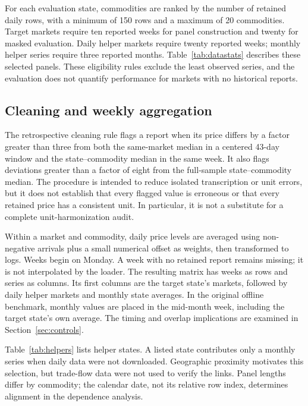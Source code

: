\documentclass[sigconf,nonacm,balance=false]{acmart}
\begin{document}
For each evaluation state, commodities are ranked by the number of retained daily rows, with a minimum of 150 rows and a maximum of 20 commodities. Target markets require ten reported weeks for panel construction and twenty for masked evaluation. Daily helper markets require twenty reported weeks; monthly helper series require three reported months. Table~\ref{tab:datastats} describes these selected panels. These eligibility rules exclude the least observed series, and the evaluation does not quantify performance for markets with no historical reports.



\subsection{Cleaning and weekly aggregation}

The retrospective cleaning rule flags a report when its price differs by a factor greater than three from both the same-market median in a centered 43-day window and the state--commodity median in the same week. It also flags deviations greater than a factor of eight from the full-sample state--commodity median. The procedure is intended to reduce isolated transcription or unit errors, but it does not establish that every flagged value is erroneous or that every retained price has a consistent unit. In particular, it is not a substitute for a complete unit-harmonization audit.

Within a market and commodity, daily price levels are averaged using non-negative arrivals plus a small numerical offset as weights, then transformed to logs. Weeks begin on Monday. A week with no retained report remains missing; it is not interpolated by the loader. The resulting matrix has weeks as rows and series as columns. Its first columns are the target state's markets, followed by daily helper markets and monthly state averages. In the original offline benchmark, monthly values are placed in the mid-month week, including the target state's own average. The timing and overlap implications are examined in Section~\ref{sec:controls}.

Table~\ref{tab:helpers} lists helper states. A listed state contributes only a monthly series when daily data were not downloaded. Geographic proximity motivates this selection, but trade-flow data were not used to verify the links. Panel lengths differ by commodity; the calendar date, not its relative row index, determines alignment in the dependence analysis.
\end{document}
